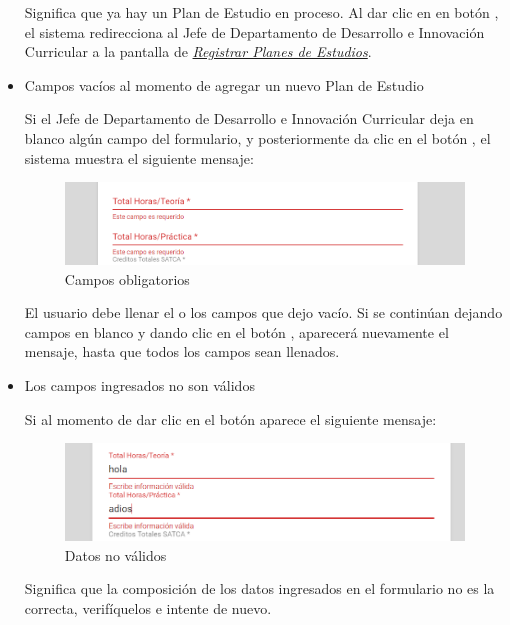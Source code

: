 \begin{itemize}
	Significa que ya hay un Plan de Estudio en proceso. Al dar clic en en botón , el sistema redirecciona al Jefe de Departamento de Desarrollo e Innovación Curricular a la pantalla de \hyperlink{registrarPE}{\textit{Registrar Planes de Estudios}}.

	\item Campos vacíos al momento de agregar un nuevo Plan de Estudio

	Si el Jefe de Departamento de Desarrollo e Innovación Curricular deja en blanco algún campo del formulario, y posteriormente da clic en el botón , el sistema muestra el siguiente mensaje:
		\begin{figure}[H]
		\centering
		\hypertarget{ms4}{\includegraphics[width=0.7\linewidth]{images/SP4-GPE/m4}}
		\caption{Campos obligatorios}
		\label{ms4}
	    \end{figure}

	El usuario debe llenar el o los campos que dejo vacío. Si se continúan dejando campos en blanco y dando clic en el botón , aparecerá nuevamente el mensaje, hasta que todos los campos sean llenados.\\

	\newpage

	\item Los campos ingresados no son válidos

	Si al momento de dar clic en el botón  aparece el siguiente mensaje:
	\begin{figure}[H]
		\centering
		\hypertarget{ms5}{\includegraphics[width=0.7\linewidth]{images/SP4-GPE/m5}}
		\caption{Datos no válidos}
		\label{ms5}
	\end{figure}

	Significa que la composición de los datos ingresados en el formulario no es la correcta, verifíquelos e intente de nuevo.

\end{itemize}